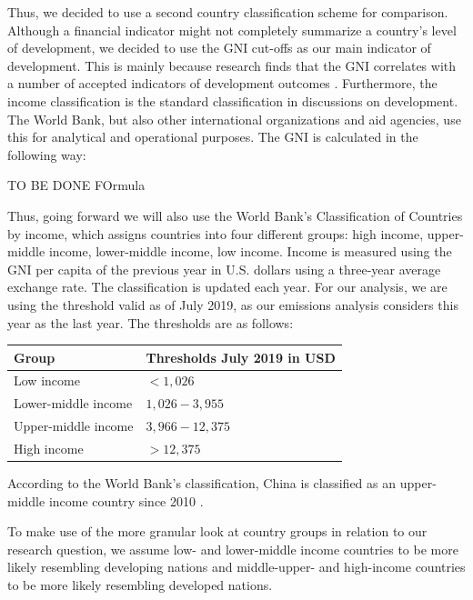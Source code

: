 \documentclass[
  12pt,
]{article}
\numberwithin{equation}{section}
\numberwithin{table}{section}
\numberwithin{figure}{section}
\begin{document}
Thus, we decided to use a second country classification scheme for
comparison. Although a financial indicator might not completely
summarize a country's level of development, we decided to use the GNI
cut-offs as our main indicator of development. This is mainly because
research finds that the GNI correlates with a number of accepted
indicators of development outcomes \citep{Fantom2016}. Furthermore, the
income classification is the standard classification in discussions on
development. The World Bank, but also other international organizations
and aid agencies, use this for analytical and operational purposes. The
GNI is calculated in the following way:

TO BE DONE FOrmula

Thus, going forward we will also use the World Bank's Classification of
Countries by income, which assigns countries into four different groups:
high income, upper-middle income, lower-middle income, low income.
Income is measured using the GNI per capita of the previous year in U.S.
dollars using a three-year average exchange rate. The classification is
updated each year. For our analysis, we are using the threshold valid as
of July 2019, as our emissions analysis considers this year as the last
year. The thresholds are as follows:

\begin{table}[!ht]
    \centering
    \begin{tabular}{|l|l|}
    \hline
        \textbf{Group  } & \textbf{Thresholds July 2019 in USD  } \\ \hline
        Low income   & $< 1,026$ \\ \hline
        Lower-middle income   & $1,026 - 3,955$ \\ \hline
        Upper-middle income  & $3,966 - 12,375$ \\ \hline
        High income  & $> 12,375$ \\ \hline
    \end{tabular}
\end{table}

According to the World Bank's classification, China is classified as an
upper-middle income country since 2010 \citep{WorldBank2022d}.

To make use of the more granular look at country groups in relation to
our research question, we assume low- and lower-middle income countries
to be more likely resembling developing nations and middle-upper- and
high-income countries to be more likely resembling developed nations.
\end{document}

